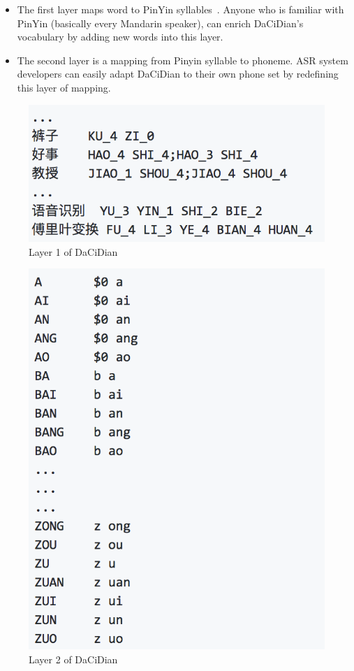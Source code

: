 \documentclass[a4paper]{article}
\begin{document}
\begin{itemize}
\item The first layer maps word to PinYin syllables~\cite{pinyin}. Anyone who is
  familiar with PinYin (basically every Mandarin speaker), can enrich DaCiDian's
  vocabulary by adding new words into this layer.
\item The second layer is a mapping from Pinyin syllable to phoneme. ASR system
  developers can easily adapt DaCiDian to their own phone set by redefining this
  layer of mapping.
\end{itemize}

\begin{figure}[t]
  \centering
  \includegraphics[width=0.8\linewidth]{dacidianl1.png}
  \caption{Layer 1 of DaCiDian}
  \label{fig:lex1}
\end{figure}
\begin{figure}[t]
  \centering
  \includegraphics[width=0.8\linewidth]{dacidianl2.png}
  \caption{Layer 2 of DaCiDian}
  \label{fig:lex2}
\end{figure}
\end{document}
